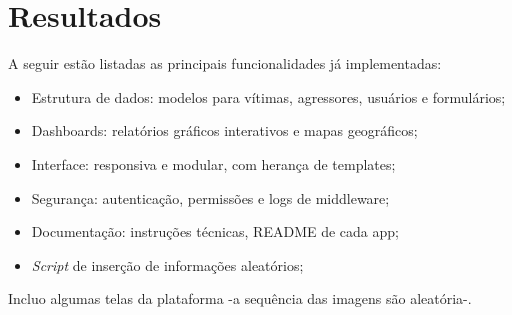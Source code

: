 \section{Resultados}

A seguir estão listadas as principais funcionalidades já implementadas:

\begin{itemize}
    \item Estrutura de dados: modelos para vítimas, agressores, usuários e formulários;
    \item Dashboards: relatórios gráficos interativos e mapas geográficos;
    \item Interface: responsiva e modular, com herança de templates;
    \item Segurança: autenticação, permissões e logs de middleware;
    \item Documentação: instruções técnicas, README de cada app;
    \item \textit{Script} de inserção de informações aleatórios;
\end{itemize}

\par Incluo algumas telas da plataforma -a sequência das imagens são aleatória-.

